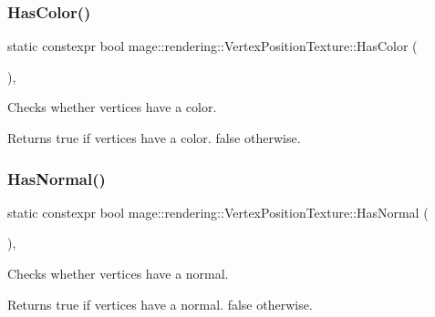 \subsubsection{\texorpdfstring{Has\+Color()}{HasColor()}}
{\footnotesize\ttfamily static constexpr bool mage\+::rendering\+::\+Vertex\+Position\+Texture\+::\+Has\+Color (\begin{DoxyParamCaption}{ }\end{DoxyParamCaption})\hspace{0.3cm}{\ttfamily [static]}, {\ttfamily [noexcept]}}

Checks whether vertices have a color.

\begin{DoxyReturn}{Returns}
{\ttfamily true} if vertices have a color. {\ttfamily false} otherwise. 
\end{DoxyReturn}
\mbox{\label{structmage_1_1rendering_1_1_vertex_position_texture_abd20ebeb7462cc449cd4a41cf4d6c2c9}} 
\subsubsection{\texorpdfstring{Has\+Normal()}{HasNormal()}}
{\footnotesize\ttfamily static constexpr bool mage\+::rendering\+::\+Vertex\+Position\+Texture\+::\+Has\+Normal (\begin{DoxyParamCaption}{ }\end{DoxyParamCaption})\hspace{0.3cm}{\ttfamily [static]}, {\ttfamily [noexcept]}}

Checks whether vertices have a normal.

\begin{DoxyReturn}{Returns}
{\ttfamily true} if vertices have a normal. {\ttfamily false} otherwise. 
\end{DoxyReturn}
\mbox{\label{structmage_1_1rendering_1_1_vertex_position_texture_a251093bc0caad749852ab5138f306909}} 
